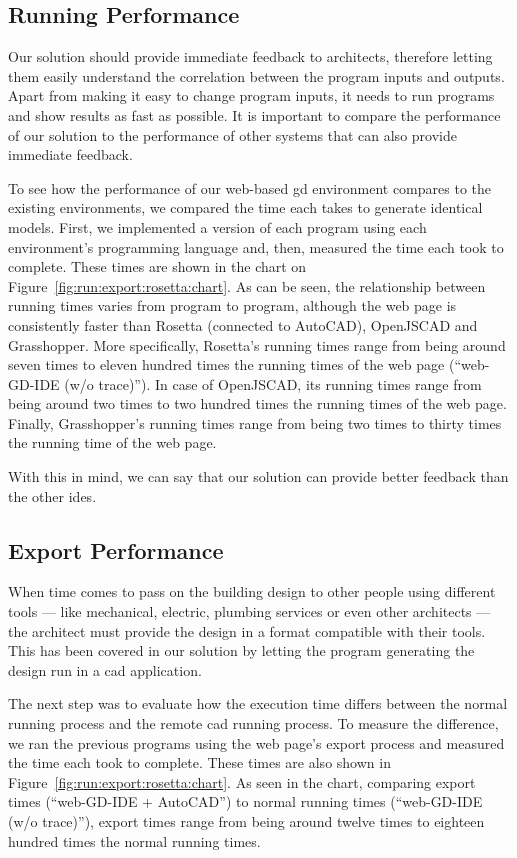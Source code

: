 \subsection{Running Performance}
Our solution should provide immediate feedback to architects, therefore letting them easily understand the correlation between the program inputs and outputs\cite{Leitao2014illustrated}.
Apart from making it easy to change program inputs, it needs to run programs and show results as fast as possible.
It is important to compare the performance of our solution to the performance of other systems that can also provide immediate feedback.

To see how the performance of our web-based \gls{gd} environment compares to the existing environments, we compared the time each takes to generate identical models.
First, we implemented a version of each program using each environment's programming language and, then, measured the time each took to complete.
These times are shown in the chart on Figure~\ref{fig:run:export:rosetta:chart}.
As can be seen, the relationship between running times varies from program to program, although the web page is consistently faster than Rosetta (connected to AutoCAD), OpenJSCAD and Grasshopper.
More specifically, Rosetta's running times range from being around seven times to eleven hundred times the running times of the web page (``web-GD-IDE (w/o trace)'').
In case of OpenJSCAD, its running times range from being around two times to two hundred times the running times of the web page.
Finally, Grasshopper's running times range from being two times to thirty times the running time of the web page.

With this in mind, we can say that our solution can provide better feedback than the other \glspl{ide}.


\subsection{Export Performance}
\label{sec:eval:export}
When time comes to pass on the building design to other people using different tools --- like mechanical, electric, plumbing services or even other architects --- the architect must provide the design in a format compatible with their tools.
This has been covered in our solution by letting the program generating the design run in a \gls{cad} application.

The next step was to evaluate how the execution time differs between the normal running process and the remote \gls{cad} running process.
To measure the difference, we ran the previous programs using the web page's export process and measured the time each took to complete.
These times are also shown in Figure~\ref{fig:run:export:rosetta:chart}.
As seen in the chart, comparing export times (``web-GD-IDE + AutoCAD'') to normal running times (``web-GD-IDE (w/o trace)''), export times range from being around twelve times to eighteen hundred times the normal running times.

